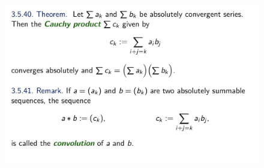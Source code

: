 \documentclass{beamer}
\begin{document}
\begin{frame}
    \begin{figure}[htbp]
        \centering
        \includegraphics[width=12cm]{convolution.jpg}
    \end{figure}
\end{frame}
\end{document}

